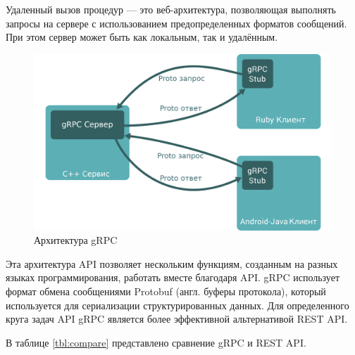 
Удаленный вызов процедур --- это веб-архитектура, позволяющая выполнять запросы на сервере с использованием предопределенных форматов сообщений. При этом сервер может быть как локальным, так и удалённым.

\begin{figure}[h]
	\centering
	\includegraphics[width=\textwidth ]{img/gRPC_ru.png}
	\caption{Архитектура gRPC}
	\label{fig:gRPC}
\end{figure} 

Эта архитектура API позволяет нескольким функциям, созданным на разных языках программирования, работать вместе благодаря API. gRPC использует формат обмена сообщениями Protobuf (англ. буферы протокола), который используется для сериализации структурированных данных. Для определенного круга задач API gRPC является более эффективной альтернативой REST API.




В таблице \ref{tbl:compare} представлено сравнение gRPC и REST API.

